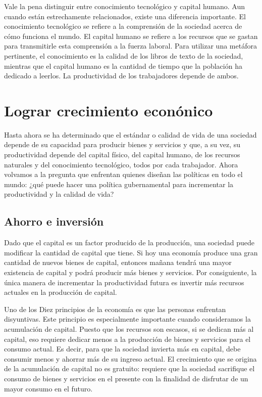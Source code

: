 \documentclass[
]{krantz}
\begin{document}
Vale la pena distinguir entre conocimiento tecnológico y capital humano. Aun cuando están estrechamente relacionados, existe una diferencia importante. El conocimiento tecnológico se refiere a la comprensión de la sociedad acerca de cómo funciona el mundo. El capital humano se refiere a los recursos que se gastan para transmitirle esta comprensión a la fuerza laboral. Para utilizar una metáfora pertinente, el conocimiento es la calidad de los libros de texto de la sociedad, mientras que el capital humano es la cantidad de tiempo que la población ha dedicado a leerlos. La productividad de los trabajadores depende de ambos.

\hypertarget{lograr-crecimiento-econuxf3nico}{%
\section{Lograr crecimiento econónico}\label{lograr-crecimiento-econuxf3nico}}

Hasta ahora se ha determinado que el estándar o calidad de vida de una sociedad depende de su capacidad para producir bienes y servicios y que, a su vez, su productividad depende del capital físico, del capital humano, de los recursos naturales y del conocimiento tecnológico, todos por cada trabajador. Ahora volvamos a la pregunta que enfrentan quienes diseñan las políticas en todo el mundo: ¿qué puede hacer una política gubernamental para incrementar la productividad y la calidad de vida?

\hypertarget{ahorro-e-inversiuxf3n}{%
\subsection{Ahorro e inversión}\label{ahorro-e-inversiuxf3n}}

Dado que el capital es un factor producido de la producción, una sociedad puede modificar la cantidad de capital que tiene. Si hoy una economía produce una gran cantidad de nuevos bienes de capital, entonces mañana tendrá una mayor existencia de capital y podrá producir más bienes y servicios. Por consiguiente, la única manera de incrementar la productividad futura es invertir más recursos actuales en la producción de capital.

Uno de los Diez principios de la economía es que las personas enfrentan disyuntivas. Este principio es especialmente importante cuando consideramos la acumulación de capital. Puesto que los recursos son escasos, si se dedican más al capital, eso requiere dedicar menos a la producción de bienes y servicios para el consumo actual. Es decir, para que la sociedad invierta más en capital, debe consumir menos y ahorrar más de su ingreso actual. El crecimiento que se origina de la acumulación de capital no es gratuito: requiere que la sociedad sacrifique el consumo de bienes y servicios en el presente con la finalidad de disfrutar de un mayor consumo en el futuro.
\end{document}
